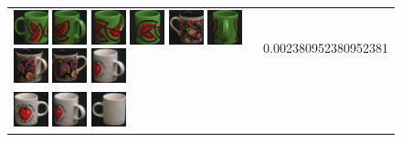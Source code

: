 \begin{figure}[tbp]
\begin{center}
\begin{tabular}{m{11cm} | m{3cm} |}
\includegraphics[width=1cm]{coil/beeld-31.eps}
\includegraphics[width=1cm]{coil/beeld-34.eps}
\includegraphics[width=1cm]{coil/beeld-33.eps}
\includegraphics[width=1cm]{coil/beeld-32.eps}
\includegraphics[width=1cm]{coil/beeld-61.eps}
\includegraphics[width=1cm]{coil/beeld-35.eps}
\includegraphics[width=1cm]{coil/beeld-64.eps}
\includegraphics[width=1cm]{coil/beeld-60.eps}
\includegraphics[width=1cm]{coil/beeld-40.eps}
& {\scriptsize 0.002380952380952381}
\\
\includegraphics[width=1cm]{coil/beeld-36.eps}
\includegraphics[width=1cm]{coil/beeld-40.eps}
\includegraphics[width=1cm]{coil/beeld-37.eps}

\end{tabular}
\end{center}
\end{figure}

